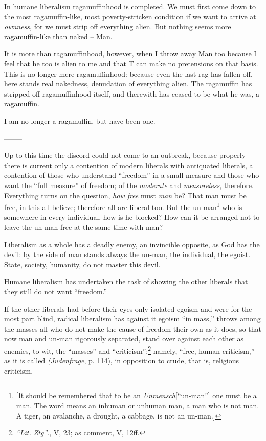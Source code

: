 In humane liberalism ragamuffinhood is completed. We must first come down to 
the most ragamuffin-like, most poverty-stricken condition if we want to arrive 
at \textit{ownness}, for we must strip off everything alien. But nothing seems 
more ragamuffin-like than naked -- Man.

It is more than ragamuffinhood, however, when I throw away Man too because I 
feel that he too is alien to me and that T can make no pretensions on that 
basis. This is no longer mere ragamuffinhood: because even the last rag has 
fallen off, here stands real nakedness, denudation of everything alien. The 
ragamuffin has stripped off ragamuffinhood itself, and therewith has ceased to 
be what he was, a ragamuffin.

I am no longer a ragamuffin, but have been one.

\begin{center}
--------\end{center}


Up to this time the discord could not come to an outbreak, because properly 
there is current only a contention of modern liberals with antiquated 
liberals, a contention of those who understand ``freedom'' in a small 
measure and those who want the ``full measure'' of freedom; of the 
\textit{moderate} and \textit{measureless}, therefore. Everything turns on the 
question, \textit{how free} must \textit{man} be? That man must be free, in 
this all believe; therefore all are liberal too. But the un-man\footnote{[It 
should be remembered that to be an \textit{Unmensch}[``un-man''] one must be 
a man. The word means an inhuman or unhuman man, a man who is not man. A 
tiger, an avalanche, a drought, a cabbage, is not an un-man.]} who is 
somewhere in every individual, how is he blocked? How can it be arranged not 
to leave the un-man free at the same time with man?

Liberalism as a whole has a deadly enemy, an invincible opposite, as God has 
the devil: by the side of man stands always the un-man, the individual, the 
egoist. State, society, humanity, do not master this devil.

Humane liberalism has undertaken the task of showing the other liberals that 
they still do not want ``freedom.''

If the other liberals had before their eyes only isolated egoism and were for 
the most part blind, radical liberalism has against it egoism ``in mass,'' 
throws among the masses all who do not make the cause of freedom their own as 
it does, so that now man and un-man rigorously separated, stand over against 
each other as enemies, to wit, the ``masses'' and 
``criticism'';\footnote{\textit{``Lit. Ztg''}., V, 23; as comment, V, 12ff.} 
namely, ``free, human criticism,'' as it is called \textit{(Judenfrage}, p. 
114), in opposition to crude, that is, religious criticism.

